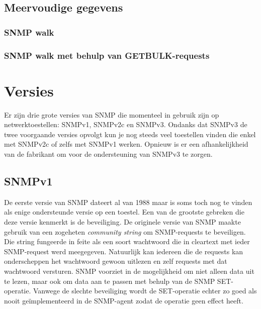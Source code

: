 \subsection{Meervoudige gegevens}


\subsubsection{SNMP walk}

\subsubsection{SNMP walk met behulp van GETBULK-requests}


\section{Versies}
Er zijn drie grote versies van SNMP die momenteel in gebruik zijn op netwerktoestellen: SNMPv1, SNMPv2c en SNMPv3.
Ondanks dat SNMPv3 de twee voorgaande versies opvolgt kun je nog steeds veel toestellen vinden die enkel met SNMPv2c of zelfs met SNMPv1 werken.
Opnieuw is er een afhankelijkheid van de fabrikant om voor de ondersteuning van SNMPv3 te zorgen.


\subsection{SNMPv1}
De eerste versie van SNMP dateert al van 1988 maar is soms toch nog te vinden als enige ondersteunde versie op een toestel.
Een van de grootste gebreken die deze versie kenmerkt is de beveiliging.
De originele versie van SNMP maakte gebruik van een zogeheten \emph{community string} om SNMP-requests te beveiligen.
Die string fungeerde in feite als een soort wachtwoord die in cleartext met ieder SNMP-request werd meegegeven\cite{snmp-wiki}.
Natuurlijk kan iedereen die de requests kan onderscheppen het wachtwoord gewoon uitlezen en zelf requests met dat wachtwoord versturen.
SNMP voorziet in de mogelijkheid om niet alleen data uit te lezen, maar ook om data aan te passen met behulp van de SNMP SET-operatie.
Vanwege de slechte beveiliging wordt de SET-operatie echter zo goed als nooit geïmplementeerd in de SNMP-agent zodat de operatie geen effect heeft.

